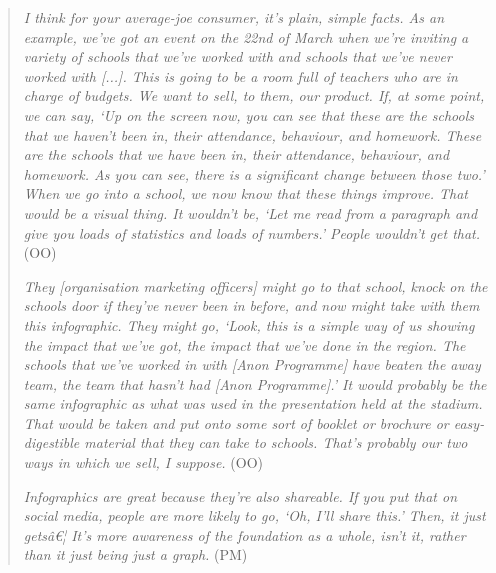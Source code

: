 \begin{quote}
    \textit{I think for your average-joe consumer, it's plain, simple facts. As an example, we've got an event on the 22nd of March when we're inviting a variety of schools that we've worked with and schools that we've never worked with [...]. This is going to be a room full of teachers who are in charge of budgets. We want to sell, to them, our product. If, at some point, we can say, `Up on the screen now, you can see that these are the schools that we haven't been in, their attendance, behaviour, and homework. These are the schools that we have been in, their attendance, behaviour, and homework. As you can see, there is a significant change between those two.' When we go into a school, we now know that these things improve. That would be a visual thing. It wouldn't be, `Let me read from a paragraph and give you loads of statistics and loads of numbers.' People wouldn't get that.} (OO)

    \textit{They [organisation marketing officers] might go to that school, knock on the schools door if they've never been in before, and now might take with them this infographic. They might go, `Look, this is a simple way of us showing the impact that we've got, the impact that we've done in the region. The schools that we've worked in with [Anon Programme] have beaten the away team, the team that hasn't had [Anon Programme].' It would probably be the same infographic as what was used in the presentation held at the stadium. That would be taken and put onto some sort of booklet or brochure or easy-digestible material that they can take to schools. That's probably our two ways in which we sell, I suppose.} (OO)

    \textit{Infographics are great because they're also shareable. If you put that on social media, people are more likely to go, `Oh, I'll share this.' Then, it just getsâ€¦ It's more awareness of the foundation as a whole, isn't it, rather than it just being just a graph.} (PM)
\end{quote}

